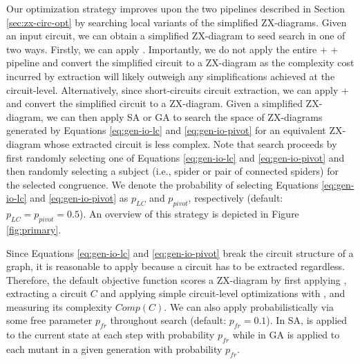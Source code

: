 Our optimization strategy improves upon the two pipelines described in Section \ref{sec:zx-circ-opt} by searching local variants of the simplified ZX-diagrams.
Given an input circuit, we can obtain a simplified ZX-diagram to seed search in one of two ways.
Firstly, we can apply .
Importantly, we do not apply the entire  +  +  pipeline and convert the simplified circuit to a ZX-diagram as the complexity cost incurred by extraction will likely outweigh any simplifications achieved at the circuit-level.
Alternatively, since  short-circuits circuit extraction, we can apply  +  and convert the simplified circuit to a ZX-diagram.
Given a simplified ZX-diagram, we can then apply SA or GA to search the space of ZX-diagrams generated by Equations \ref{eq:gen-io-lc} and \ref{eq:gen-io-pivot} for an equivalent ZX-diagram whose extracted circuit is less complex.
Note that search proceeds by first randomly selecting one of Equations \ref{eq:gen-io-lc} and \ref{eq:gen-io-pivot} and then randomly selecting a subject (i.e., spider or pair of connected spiders) for the selected congruence.
We denote the probability of selecting Equations \ref{eq:gen-io-lc} and \ref{eq:gen-io-pivot} as $p_{LC}$ and $p_{pivot}$, respectively (default: $p_{LC} = p_{pivot} = 0.5$).
An overview of this strategy is depicted in Figure \ref{fig:primary}.

Since Equations \ref{eq:gen-io-lc} and \ref{eq:gen-io-pivot} break the circuit structure of a graph, it is reasonable to apply  because a circuit has to be extracted regardless.
Therefore, the default objective function scores a ZX-diagram by first applying , extracting a circuit $C$ and applying simple circuit-level optimizations with , and measuring its complexity $Comp(C)$.
We can also apply  probabilistically via some free parameter $p_{fr}$ throughout search (default: $p_{fr} = 0.1$).
In SA,  is applied to the current state at each step with probability $p_{fr}$ while in GA  is applied to each mutant in a given generation with probability $p_{fr}$.

